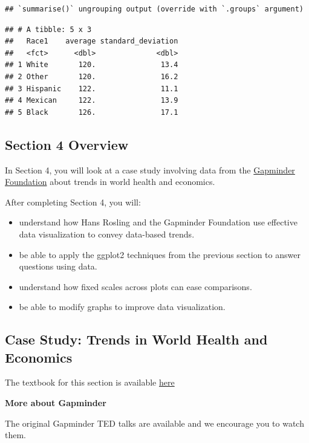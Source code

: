 \documentclass[
]{article}
\providecommand{\tightlist}{%
  \setlength{\itemsep}{0pt}\setlength{\parskip}{0pt}}
\begin{document}
\begin{verbatim}
## `summarise()` ungrouping output (override with `.groups` argument)
\end{verbatim}

\begin{verbatim}
## # A tibble: 5 x 3
##   Race1    average standard_deviation
##   <fct>      <dbl>              <dbl>
## 1 White       120.               13.4
## 2 Other       120.               16.2
## 3 Hispanic    122.               11.1
## 4 Mexican     122.               13.9
## 5 Black       126.               17.1
\end{verbatim}

\hypertarget{section-4-overview}{%
\subsection{Section 4 Overview}\label{section-4-overview}}

In Section 4, you will look at a case study involving data from the
\href{https://www.gapminder.org}{Gapminder Foundation} about trends in
world health and economics.

After completing Section 4, you will:

\begin{itemize}
\tightlist
\item
  understand how Hans Rosling and the Gapminder Foundation use effective
  data visualization to convey data-based trends.
\item
  be able to apply the ggplot2 techniques from the previous section to
  answer questions using data.
\item
  understand how fixed scales across plots can ease comparisons.
\item
  be able to modify graphs to improve data visualization.
\end{itemize}

\hypertarget{case-study-trends-in-world-health-and-economics}{%
\subsection{Case Study: Trends in World Health and
Economics}\label{case-study-trends-in-world-health-and-economics}}

The textbook for this section is available
\href{https://rafalab.github.io/dsbook/gapminder.html\#case-study-new-insights-on-poverty}{here}

\textbf{More about Gapminder}

The original Gapminder TED talks are available and we encourage you to
watch them.
\end{document}
